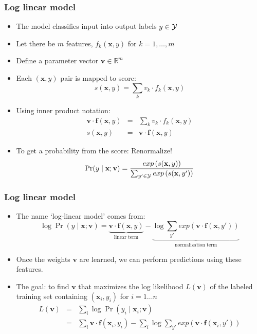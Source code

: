 \begin{frame}
\frametitle{Log linear model}
\begin{itemize}[<+->]
\item The model classifies input into output labels $y \in {\cal Y}$
\item Let there be $m$ features, $f_k(\textbf{x}, y)$ for $k = 1, \ldots, m$
\item Define a parameter vector $\textbf{v} \in \mathbb{R}^m$
\item Each $(\textbf{x}, y)$ pair is mapped to score:
\[ s(\textbf{x}, y) = \sum_k v_k \cdot f_k(\textbf{x}, y) \]
\item Using inner product notation:
\begin{eqnarray*}
\textbf{v} \cdot \textbf{f}(\textbf{x}, y) & = & \sum_k v_k \cdot f_k(\textbf{x}, y) \\
s(\textbf{x}, y) & = & \textbf{v} \cdot \textbf{f}(\textbf{x}, y) 
\end{eqnarray*}
\item To get a probability from the score: Renormalize! 
\[ \Pr(y \mid \textbf{x}; \textbf{v}) = \frac{exp\left(s(\textbf{x}, y)\right)}{\sum_{y' \in {\cal Y}} exp\left(s(\textbf{x}, y')\right)} \]
\end{itemize}
\end{frame}

\begin{frame}
\frametitle{Log linear model}
\begin{itemize}[<+->]
\item The name `log-linear model' comes from:
\[ \log \Pr(y \mid \textbf{x}; \textbf{v}) = \underbrace{\textbf{v} \cdot \textbf{f}(\textbf{x}, y)}_{\textrm{linear term}} - \underbrace{\log \sum_{y'} exp\left( \textbf{v} \cdot \textbf{f}(\textbf{x}, y') \right)}_{\textrm{normalization term}} \]
\item Once the weights $\textbf{v}$ are learned, we can perform predictions using these features.
\item The goal: to find $\textbf{v}$ that maximizes the log likelihood $L(\textbf{v})$ of the labeled training set containing $(\textbf{x}_i, y_i)$ for $i = 1 \ldots n$
\begin{eqnarray*}
L(\textbf{v}) &=& \sum_{i} \log \Pr(y_i \mid \textbf{x}_i; \textbf{v}) \\
&=& \sum_i \textbf{v} \cdot \textbf{f}(\textbf{x}_i, y_i) - \sum_i \log \sum_{y'} exp\left( \textbf{v} \cdot \textbf{f}(\textbf{x}_i, y') \right) 
\end{eqnarray*}
\end{itemize}
\end{frame}

